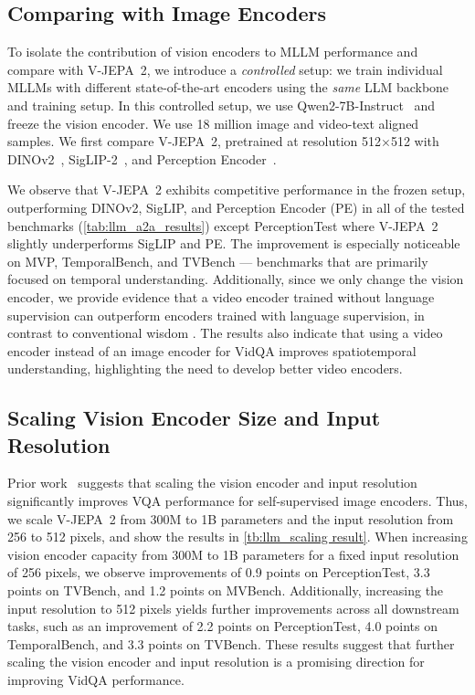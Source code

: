\documentclass[]{fairmeta}
\newcommand{\model}{V-JEPA~2\xspace}
\begin{document}
\subsection{Comparing with Image Encoders}
\label{sec:vqa_comparing_image_encoders}

To isolate the contribution of vision encoders to MLLM performance and compare with \model, we introduce a \textit{controlled} setup: we train individual MLLMs with different state-of-the-art encoders using the \textit{same} LLM backbone and training setup.
In this controlled setup, we use Qwen2-7B-Instruct~\citep{yang2024qwen2technicalreport} and freeze the vision encoder.
We use 18 million image and video-text aligned samples.
We first compare \model, pretrained at resolution 512$\times$512 with DINOv2~\citep{oquab2023dinov2}, SigLIP-2~\citep{tschannen2025siglip}, and Perception Encoder~\citep{bolya_perception_encoder_2025}. 

We observe that \model exhibits competitive performance in the frozen setup, outperforming DINOv2, SigLIP, and Perception Encoder (PE) in all of the tested benchmarks (\autoref{tab:llm_a2a_results}) except PerceptionTest where \model slightly underperforms SigLIP and PE. The improvement is especially noticeable on MVP, TemporalBench, and TVBench --- benchmarks that are primarily focused on temporal understanding. 
Additionally, since we only change the vision encoder, we provide evidence that a video encoder trained without language supervision can outperform encoders trained with language supervision, in contrast to conventional wisdom \citep{tong2024cambrian, li2024llava, liu2024nvila, yuan2025tarsier2}. The results also indicate that using a video encoder instead of an image encoder for VidQA improves spatiotemporal understanding, highlighting the need to develop better video encoders.

\subsection{Scaling Vision Encoder Size and Input Resolution}
\label{sec:vqa_scaling_encoder_and_resolution}
Prior work~\citep{fan2025scaling} suggests that scaling the vision encoder and input resolution significantly improves VQA performance for self-supervised image encoders. Thus, we scale \model from 300M to 1B parameters and the input resolution from 256 to 512 pixels, and show the results in \autoref{tb:llm_scaling result}. When increasing vision encoder capacity from 300M to 1B parameters for a fixed input resolution of 256 pixels, we observe improvements of 0.9 points on PerceptionTest, 3.3 points on TVBench, and 1.2 points on MVBench. Additionally, increasing the input resolution to 512 pixels yields further improvements across all downstream tasks, such as an improvement of 2.2 points on PerceptionTest, 4.0 points on TemporalBench, and 3.3 points on TVBench. These results suggest that further scaling the vision encoder and input resolution is a promising direction for improving VidQA performance.
\end{document}
